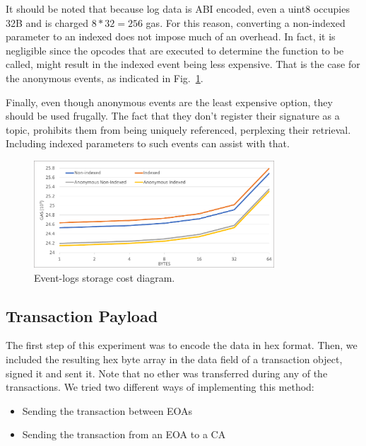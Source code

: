 It should be noted that because log data is ABI encoded, even a uint8 occupies 32B and is charged \( 8*32 = 256 \) gas. For this reason, converting a non-indexed parameter to an indexed does not impose much of an overhead. In fact, it is negligible since the opcodes that are executed to determine the function to be called, might result in the indexed event being less expensive. That is the case for the anonymous events, as indicated in Fig.~\ref{fig:logs}.

Finally, even though anonymous events are the least expensive option, they should be used frugally. The fact that they don’t register their signature as a topic, prohibits them from being uniquely referenced, perplexing their retrieval. Including indexed parameters to such events can assist with that.


\begin{figure}[htbp]
\centerline{\includegraphics[width=9cm]{figs/logs_1.pdf}}
\caption{Event-logs storage cost diagram.}
\label{fig:logs}
\end{figure}

\subsection{Transaction Payload}\label{subsection:evaluation_payload}
The first step of this experiment was to encode the data in hex format. Then, we included the resulting hex byte array in the data field of a transaction object, signed it and sent it. Note that no ether was transferred during any of the transactions. We tried two different ways of implementing this method:

\begin{itemize}[topsep=0pt, itemsep=0pt]
  \item Sending the transaction between EOAs
  \item Sending the transaction from an EOA to a CA
\end{itemize}

